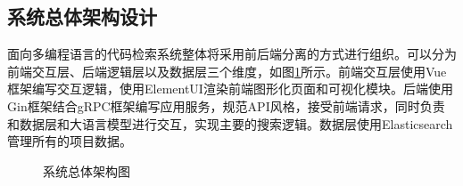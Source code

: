 \documentclass[UTF8,a4paper,12pt]{ctexart}
\numberwithin{equation}{section}
\begin{document}
\subsection{系统总体架构设计}
面向多编程语言的代码检索系统整体将采用前后端分离的方式进行组织。可以分为前端交互层、后端逻辑层以及数据层三个维度，如图\ref{all_structure}所示。前端交互层使用Vue框架编写交互逻辑，使用ElementUI渲染前端图形化页面和可视化模块。后端使用Gin框架结合gRPC框架编写应用服务，规范API风格，接受前端请求，同时负责和数据层和大语言模型进行交互，实现主要的搜索逻辑。数据层使用Elasticsearch管理所有的项目数据。
\begin{figure}[H]
	\caption{系统总体架构图}
	\label{all_structure}
\end{figure}
\end{document}
